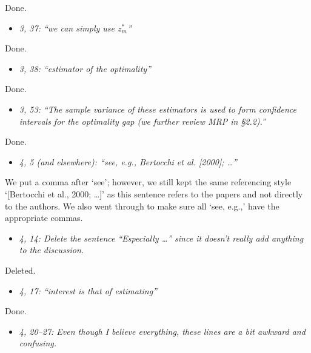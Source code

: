 \documentclass[11pt,notitlepage,onecolumn]{article}
\newcommand{\noi}{\noindent}
\begin{document}
\noi
Done.  
\medskip 


\begin{itemize}
\item[] \textit{3, 37: ``we can simply use $z_m^*$''}
\end{itemize}

\noi
Done. 
\medskip 


\begin{itemize}
\item[] \textit{3, 38: ``estimator of the optimality''}
\end{itemize}

\noi
Done.  
\medskip 


\begin{itemize}
\item[] \textit{3, 53: ``The sample variance of these estimators is used to form confidence intervals for the optimality gap (we further review MRP in \S 2.2).''}
\end{itemize}

\noi
Done. 
\medskip 


\begin{itemize}
\item[] \textit{4, 5 (and elsewhere): ``see, e.g., Bertocchi et al. [2000]; \ldots ''}
\end{itemize}

\noi
We put a comma after `see'; however, we still kept the same referencing style `[Bertocchi et al., 2000; \ldots]' as this sentence refers to the papers and not directly to the authors. 
We also went through to make sure all `see, e.g.,' have the appropriate commas.
\medskip 


\begin{itemize}
\item[] \textit{4, 14: Delete the sentence ``Especially \ldots '' since it doesn't really add anything to the discussion.}
\end{itemize}

\noi
Deleted.
\medskip 


\begin{itemize}
\item[] \textit{4, 17: ``interest is that of estimating''}
\end{itemize}

\noi
Done.  
\medskip 


\begin{itemize}
\item[] \textit{4, 20--27: Even though I believe everything, these lines are a bit awkward and confusing.}
\end{itemize}
\end{document}
